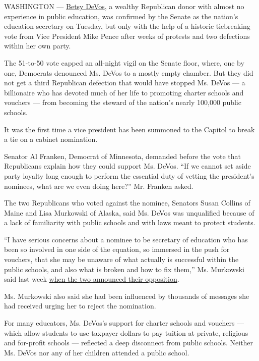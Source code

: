 WASHINGTON ---
\href{https://www.nytimes.com/2017/02/07/us/politics/betsy-devos-education-secretary-confirmation.html}{Betsy
DeVos}, a wealthy Republican donor with almost no experience in public
education, was confirmed by the Senate as the nation's education
secretary on Tuesday, but only with the help of a historic tiebreaking
vote from Vice President Mike Pence after weeks of protests and two
defections within her own party.

The 51-to-50 vote capped an all-night vigil on the Senate floor, where,
one by one, Democrats denounced Ms. DeVos to a mostly empty chamber. But
they did not get a third Republican defection that would have stopped
Ms. DeVos --- a billionaire who has devoted much of her life to
promoting charter schools and vouchers --- from becoming the steward of
the nation's nearly 100,000 public schools.

It was the first time a vice president has been summoned to the Capitol
to break a tie on a cabinet nomination.

Senator Al Franken, Democrat of Minnesota, demanded before the vote that
Republicans explain how they could support Ms. DeVos. ``If we cannot set
aside party loyalty long enough to perform the essential duty of vetting
the president's nominees, what are we even doing here?'' Mr. Franken
asked.

The two Republicans who voted against the nominee, Senators Susan
Collins of Maine and Lisa Murkowski of Alaska, said Ms. DeVos was
unqualified because of a lack of familiarity with public schools and
with laws meant to protect students.

``I have serious concerns about a nominee to be secretary of education
who has been so involved in one side of the equation, so immersed in the
push for vouchers, that she may be unaware of what actually is
successful within the public schools, and also what is broken and how to
fix them,'' Ms. Murkowski said last week
\href{https://www.nytimes.com/2017/02/01/us/politics/trump-cabinet-nominations-senate.html}{when
the two announced their opposition}.

Ms. Murkowski also said she had been influenced by thousands of messages
she had received urging her to reject the nomination.

For many educators, Ms. DeVos's support for charter schools and vouchers
--- which allow students to use taxpayer dollars to pay tuition at
private, religious and for-profit schools --- reflected a deep
disconnect from public schools. Neither Ms. DeVos nor any of her
children attended a public school.

